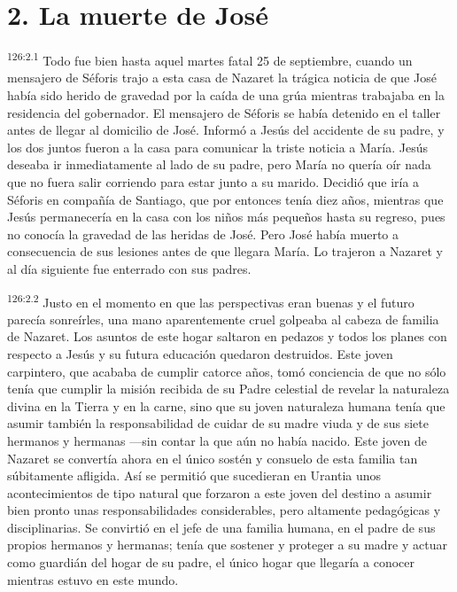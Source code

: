\section*{2. La muerte de José}
\par 
\textsuperscript{126:2.1} Todo fue bien hasta aquel martes fatal 25 de septiembre, cuando un mensajero de Séforis trajo a esta casa de Nazaret la trágica noticia de que José había sido herido de gravedad por la caída de una grúa mientras trabajaba en la residencia del gobernador. El mensajero de Séforis se había detenido en el taller antes de llegar al domicilio de José. Informó a Jesús del accidente de su padre, y los dos juntos fueron a la casa para comunicar la triste noticia a María. Jesús deseaba ir inmediatamente al lado de su padre, pero María no quería oír nada que no fuera salir corriendo para estar junto a su marido. Decidió que iría a Séforis en compañía de Santiago, que por entonces tenía diez años, mientras que Jesús permanecería en la casa con los niños más pequeños hasta su regreso, pues no conocía la gravedad de las heridas de José. Pero José había muerto a consecuencia de sus lesiones antes de que llegara María. Lo trajeron a Nazaret y al día siguiente fue enterrado con sus padres.

\par 
\textsuperscript{126:2.2} Justo en el momento en que las perspectivas eran buenas y el futuro parecía sonreírles, una mano aparentemente cruel golpeaba al cabeza de familia de Nazaret. Los asuntos de este hogar saltaron en pedazos y todos los planes con respecto a Jesús y su futura educación quedaron destruidos. Este joven carpintero, que acababa de cumplir catorce años, tomó conciencia de que no sólo tenía que cumplir la misión recibida de su Padre celestial de revelar la naturaleza divina en la Tierra y en la carne, sino que su joven naturaleza humana tenía que asumir también la responsabilidad de cuidar de su madre viuda y de sus siete hermanos y hermanas ---sin contar la que aún no había nacido. Este joven de Nazaret se convertía ahora en el único sostén y consuelo de esta familia tan súbitamente afligida. Así se permitió que sucedieran en Urantia unos acontecimientos de tipo natural que forzaron a este joven del destino a asumir bien pronto unas responsabilidades considerables, pero altamente pedagógicas y disciplinarias. Se convirtió en el jefe de una familia humana, en el padre de sus propios hermanos y hermanas; tenía que sostener y proteger a su madre y actuar como guardián del hogar de su padre, el único hogar que llegaría a conocer mientras estuvo en este mundo.

